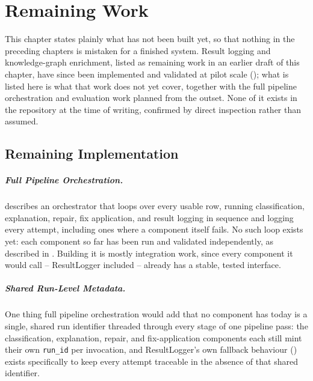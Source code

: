 \chapter{Remaining Work}
\label{chap:future-work}

This chapter states plainly what has not been built yet, so that nothing in
the preceding chapters is mistaken for a finished system. Result logging
and knowledge-graph enrichment, listed as remaining work in an earlier
draft of this chapter, have since been implemented and validated at pilot
scale (); what is listed here is what
that work does not yet cover, together with the full pipeline orchestration
and evaluation work planned from the outset. None of it exists in the
repository at the time of writing, confirmed by direct inspection rather
than assumed.

\section{Remaining Implementation}

\paragraph{Full Pipeline Orchestration.}  describes
an orchestrator that loops over every usable row, running classification,
explanation, repair, fix application, and result logging in sequence and
logging every attempt, including ones where a component itself fails. No
such loop exists yet: each component so far has been run and validated
independently, as described in .
Building it is mostly integration work, since every component it would
call -- ResultLogger included -- already has a stable, tested interface.

\paragraph{Shared Run-Level Metadata.} One thing full pipeline orchestration
would add that no component has today is a single, shared run identifier
threaded through every stage of one pipeline pass: the classification,
explanation, repair, and fix-application components each still mint their
own \texttt{run\_id} per invocation, and ResultLogger's own fallback
behaviour () exists specifically to keep every
attempt traceable in the absence of that shared identifier.

